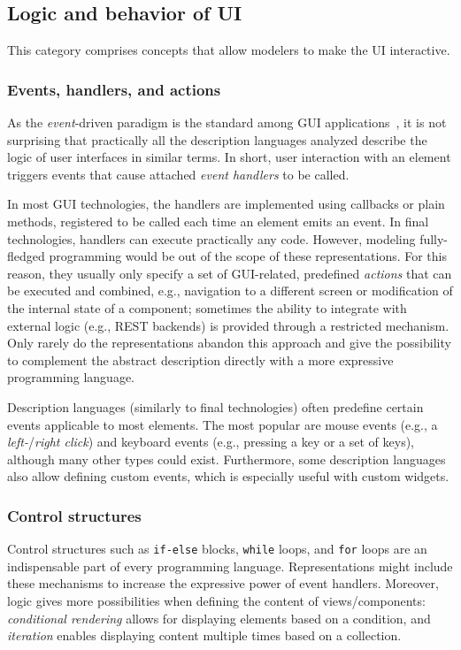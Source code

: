 \subsection{Logic and behavior of UI}\label{subsec:logic-and-behavior-of-ui}

This category comprises concepts that allow modelers to make the UI interactive.

\subsubsection{Events, handlers, and actions}
As the \emph{event}-driven paradigm is the standard among GUI applications~\cite{wang2016event}, it is not surprising that practically all the description languages analyzed describe the logic of user interfaces in similar terms.
In short, user interaction with an element triggers events that cause attached \emph{event handlers} to be called.

In most GUI technologies, the handlers are implemented using callbacks or plain methods, registered to be called each time an element emits an event.
In final technologies, handlers can execute practically any code.
However, modeling fully-fledged programming would be out of the scope of these representations.
For this reason, they usually only specify a set of GUI-related, predefined \emph{actions} that can be executed and combined, e.g., navigation to a different screen or modification of the internal state of a component;
sometimes the ability to integrate with external logic (e.g., REST backends) is provided through a restricted mechanism.
Only rarely do the representations abandon this approach and give the possibility to complement the abstract description directly with a more expressive programming language.

Description languages (similarly to final technologies) often predefine certain events applicable to most elements.
The most popular are mouse events (e.g., a \emph{left-}/\emph{right click}) and keyboard events (e.g., pressing a key or a set of keys), although many other types could exist.
Furthermore, some description languages also allow defining custom events, which is especially useful with custom widgets.

\subsubsection{Control structures}
Control structures such as \texttt{if-else} blocks, \texttt{while} loops, and \texttt{for} loops are an indispensable part of every programming language.
Representations might include these mechanisms to increase the expressive power of event handlers.
Moreover, logic gives more possibilities when defining the content of views/components: \emph{conditional rendering} allows for displaying elements based on a condition, and \emph{iteration} enables displaying content multiple times based on a collection.

